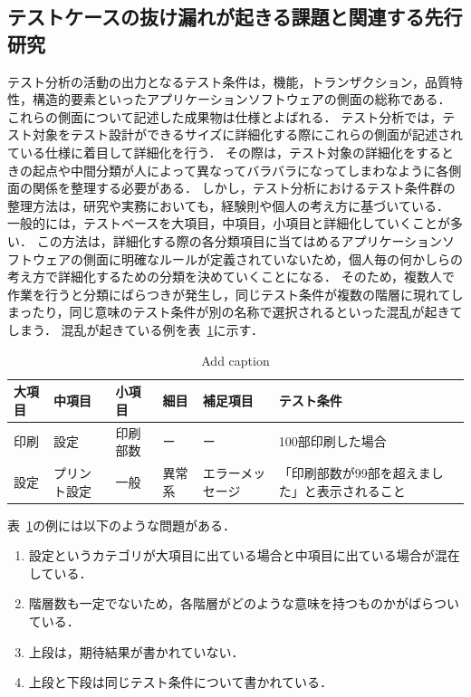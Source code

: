 \subsection{テストケースの抜け漏れが起きる課題と関連する先行研究}
テスト分析の活動の出力となるテスト条件は，機能，トランザクション，品質特性，構造的要素といったアプリケーションソフトウェアの側面の総称である．
これらの側面について記述した成果物は仕様とよばれる．
テスト分析では，テスト対象をテスト設計ができるサイズに詳細化する際にこれらの側面が記述されている仕様に着目して詳細化を行う．
その際は，テスト対象の詳細化をするときの起点や中間分類が人によって異なってバラバラになってしまわなように各側面の関係を整理する必要がある．
しかし，テスト分析におけるテスト条件群の整理方法は，研究や実務においても，経験則や個人の考え方に基づいている．
一般的には，テストベースを大項目，中項目，小項目と詳細化していくことが多い．
この方法は，詳細化する際の各分類項目に当てはめるアプリケーションソフトウェアの側面に明確なルールが定義されていないため，個人毎の何かしらの考え方で詳細化するための分類を決めていくことになる．
そのため，複数人で作業を行うと分類にばらつきが発生し，同じテスト条件が複数の階層に現れてしまったり，同じ意味のテスト条件が別の名称で選択されるといった混乱が起きてしまう．
混乱が起きている例を表~\ref{tab:analysissample}に示す．
\begin{table}[htbp]
  \centering
  \caption{Add caption}
    \begin{tabular}{|l|l|l|l|l|p{9.335em}|}
    \hline
    大項目   & 中項目   & 小項目   & 細目    & 補足項目  & テスト条件 \bigstrut\\
    \hline
    印刷    & 設定    & 印刷部数  & ー     & ー     & 100部印刷した場合 \bigstrut\\
    \hline
    設定    & プリント設定 & 一般    & 異常系   & エラーメッセージ & 「印刷部数が99部を超えました」と表示されること \bigstrut\\
    \hline
    \end{tabular}%
  \label{tab:analysissample}%
\end{table}%
表~\ref{tab:analysissample}の例には以下のような問題がある．
\begin{enumerate}
\item 設定というカテゴリが大項目に出ている場合と中項目に出ている場合が混在している．
\item 階層数も一定でないため，各階層がどのような意味を持つものかがばらついている．
\item 上段は，期待結果が書かれていない．
\item 上段と下段は同じテスト条件について書かれている．
\end{enumerate}
